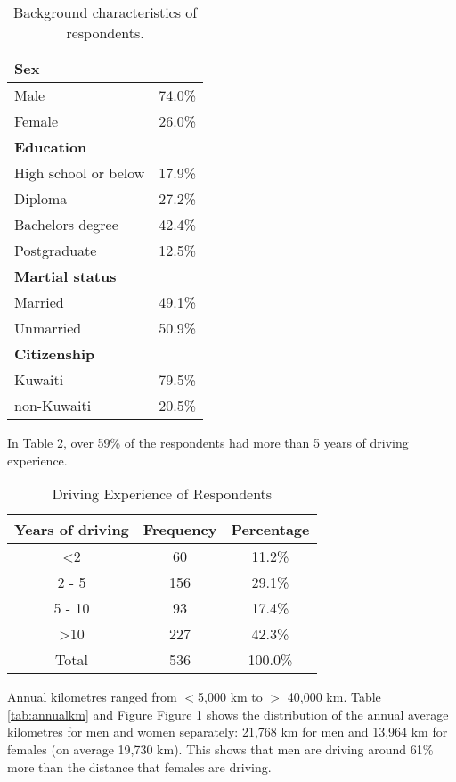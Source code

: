 \documentclass[preprint,12pt,a4paper,authoryear]{elsarticle}
\begin{document}
\begin{linenumbers}
\begin{table}[H]
\centering
\caption{Background characteristics of respondents.}
\label{tb:respondents}
\begin{tabular}{@{}lc@{}}
\toprule
\textbf{Sex} &  \\ \midrule
Male & 74.0\% \\
Female & 26.0\% \\ \midrule
\textbf{Education} &  \\ \midrule
High school or below & 17.9\% \\
Diploma & 27.2\% \\
Bachelors degree & 42.4\% \\
Postgraduate & 12.5\% \\ \midrule
\textbf{Martial status} &  \\ \midrule
Married & 49.1\% \\
Unmarried & 50.9\% \\ \midrule
\textbf{Citizenship} &  \\ \midrule
Kuwaiti & 79.5\% \\
non-Kuwaiti & 20.5\% \\ \bottomrule
\end{tabular}
\end{table}

In Table \ref{tab:drive-exp}, over 59\% of the respondents had more than 5 years of driving experience.

\begin{table}[H]
\centering
\caption{Driving Experience of Respondents}
\label{tab:drive-exp}
\begin{tabular}{@{}ccc@{}}
\toprule
\textbf{Years of driving} & \textbf{Frequency} & \textbf{Percentage} \\ \midrule
\textless 2 & 60 & 11.2\% \\
2 - 5 & 156 & 29.1\% \\
5 - 10 & 93 & 17.4\% \\
\textgreater10 & 227 & 42.3\% \\
Total & 536 & 100.0\% \\ \bottomrule
\end{tabular}
\end{table}

Annual kilometres ranged from $<$5,000 km to $>$ 40,000 km. Table \ref{tab:annualkm} and Figure Figure 1 shows the distribution of the annual average kilometres for men and women separately: 21,768 km for men and 13,964 km for females (on average 19,730 km). This shows that men are driving around 61\% more than the distance that females are driving.


\end{linenumbers}
\end{document}
